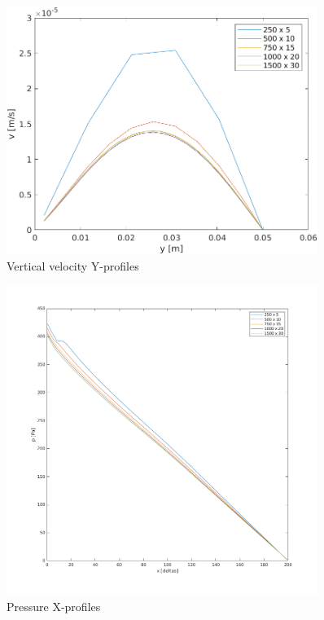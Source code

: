 \documentclass[12pt]{article}
\begin{document}
        \begin{figure}[ht!]
                \centering
                \includegraphics[width=0.9\textwidth]{V_Independence.png}
                \caption{Vertical velocity Y-profiles}
                \label{fig:V_Ind}
        \end{figure}

        \begin{figure}[ht!]
                \centering
                \includegraphics[width=0.9\textwidth]{P_Independence.png}
                \caption{Pressure X-profiles}
                \label{fig:P_Ind}
        \end{figure}
\end{document}
